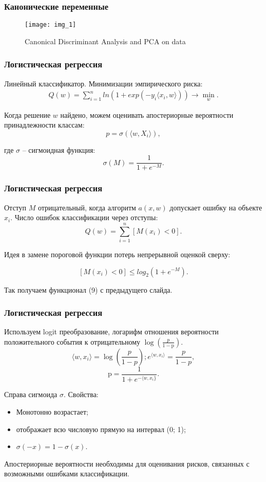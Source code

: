 \documentclass[11pt]{beamer}
\begin{document}
	\begin{frame}
	\frametitle{Канонические переменные}

	\begin{figure}
		\texttt{[image: img\_1]}
	\caption{Canonical Discriminant Analysis and PCA on data}
	\label{2}
	\end{figure}
	
	\end{frame}


		


\begin{frame}
	\frametitle{Логистическая регрессия}
	
	Линейный классификатор. Минимизации эмпирического риска:
	\begin{eqnarray}
		Q(w) = \sum_{i = 1}^n ln(1 + exp(-y_i \langle      x_i, w \rangle)) \rightarrow \underset{w} \min.
	\end{eqnarray}

	Когда решение $w$ найдено, можем оценивать апостериорные вероятности принадлежности классам:
	$$
	p=\sigma(\langle w,X_{i} \rangle),
	$$
	
	где $\sigma$ -- сигмоидная функция: 
	$$
	\sigma(M)=\frac{1}{1+e^{-M}}.
	$$
	

	
	
\end{frame}

\begin{frame}
	\frametitle{Логистическая регрессия}
	
	Отступ $M$ отрицательный, когда алгоритм $a (x, w)$ допускает ошибку на объекте $x_i$. Число ошибок классификации через отступы:
	$$
	Q(w) = \sum_{i=1}^{n} [M (x_i) < 0] .
	$$
	
	Идея в замене пороговой функции потерь непрерывной оценкой сверху:
	
	$$
	[M (x_i) < 0] \le log_2 (1 + e^{-M}).
	$$
	
	
	Так получаем функционал (9) с предыдущего слайда.

	
\end{frame}

\begin{frame}
	\frametitle{Логистическая регрессия}
	
	Используем logit преобразование, логарифм отношения вероятности положительного события к отрицательному $\log(\frac{p}{1-\mathrm{p}})$.
	$$
	\langle w,x_{i}\rangle=\log(\frac{p}{1-p}); e^{\langle w,x_{i}\rangle}=\frac{p}{1-p},
	$$
	$$
	\mathrm{p}=\frac{1}{1+e^{-\langle w,x_{i}\}}}.
	$$
	

	
	Справа сигмоида $\sigma$. Свойства:
	\begin{itemize}
		\item Монотонно возрастает;
		\item отображает всю числовую прямую на интервал (0; 1);
		\item $\sigma(-x) = 1 - \sigma(x)$. 
	\end{itemize}

	Апостериорные вероятности необходимы для оценивания рисков, связанных с возможными ошибками классификации.

	
\end{frame}
\end{document}
